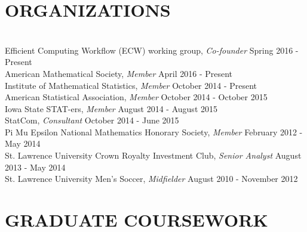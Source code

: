 \documentclass{res} %
\begin{document}
\begin{resume}
\section{ORGANIZATIONS}

\hrulefill \\
Efficient Computing Workflow (ECW) working group, {\sl Co-founder} \dotfill Spring 2016 - Present \\
American Mathematical Society, {\sl Member} \dotfill April 2016 - Present \\
Institute of Mathematical Statistics, {\sl Member} \dotfill October 2014 - Present \\
American Statistical Association, {\sl Member} \dotfill October 2014 - October 2015 \\
Iowa State STAT-ers, {\sl Member} \dotfill August 2014 - August 2015 \\
StatCom, {\sl Consultant} \dotfill October 2014 - June 2015\\
Pi Mu Epsilon National Mathematics Honorary Society, {\sl Member} \dotfill February 2012 - May 2014 \\
St. Lawrence University Crown Royalty Investment Club, {\sl Senior Analyst} \dotfill August 2013 - May 2014 \\
St. Lawrence University Men's Soccer, {\sl Midfielder} \dotfill August 2010 - November 2012 


\section{GRADUATE COURSEWORK}


\end{resume}
\end{document}
